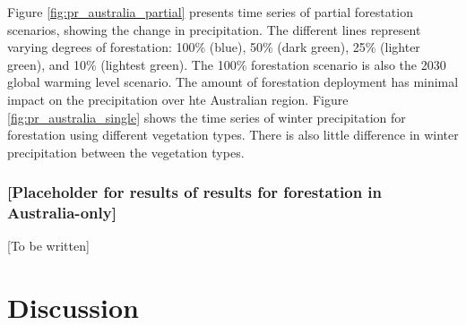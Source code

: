 \documentclass[]{article}
\begin{document}

Figure \ref{fig:pr_australia_partial} presents time series of partial forestation scenarios, showing the change in precipitation. The different lines represent varying degrees of forestation: 100\% (blue), 50\% (dark green), 25\% (lighter green), and 10\% (lightest green).
The 100\% forestation scenario is also the 2030 global warming level scenario.
The amount of forestation deployment has minimal impact on the precipitation over hte Australian region.
Figure \ref{fig:pr_australia_single} shows the time series of winter precipitation for forestation using different vegetation types.
There is also little difference in winter precipitation between the vegetation types.

\subsubsection{[Placeholder for results of results for forestation in Australia-only]}

[To be written]

\section{Discussion}
\end{document}
